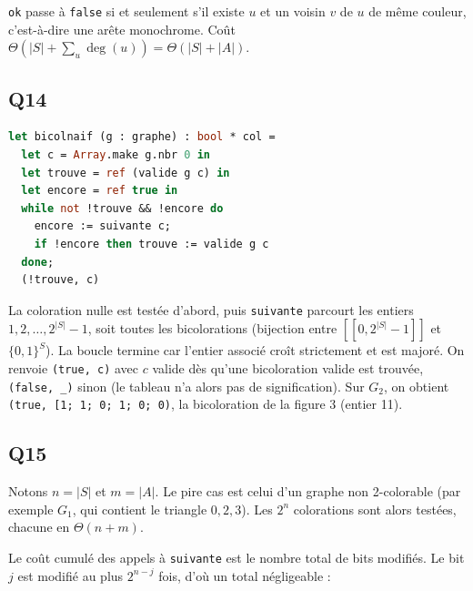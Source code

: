 \documentclass[11pt,a4paper]{article}
\newcommand{\equationajustee}[1]{%
  \sbox{\boiteequation}{$\displaystyle #1$}%
  \ifdim\wd\boiteequation>\linewidth
    \[\resizebox{\linewidth}{!}{\usebox{\boiteequation}}\]%
  \else
    \[#1\]%
  \fi}
\begin{document}
\texttt{ok} passe à \texttt{false} si et seulement s'il existe \(u\) et un voisin \(v\) de \(u\) de même couleur, c'est-à-dire une arête monochrome. Coût \(\Theta(|S| + \sum_u \deg(u)) = \Theta(|S| + |A|)\).

\hypertarget{q14}{%
\subsection{Q14}\label{q14}}

\begin{lstlisting}[language=Caml]
let bicolnaif (g : graphe) : bool * col =
  let c = Array.make g.nbr 0 in
  let trouve = ref (valide g c) in
  let encore = ref true in
  while not !trouve && !encore do
    encore := suivante c;
    if !encore then trouve := valide g c
  done;
  (!trouve, c)
\end{lstlisting}

La coloration nulle est testée d'abord, puis \texttt{suivante} parcourt les entiers \(1, 2, \dots, 2^{|S|} - 1\), soit toutes les bicolorations (bijection entre \([\![0, 2^{|S|} - 1]\!]\) et \(\{0,1\}^S\)). La boucle termine car l'entier associé croît strictement et est majoré. On renvoie \texttt{(true,\ c)} avec \(c\) valide dès qu'une bicoloration valide est trouvée, \texttt{(false,\ \_)} sinon (le tableau n'a alors pas de signification). Sur \(G_2\), on obtient \texttt{(\allowbreak{}true,\allowbreak{}\ {[}\textbar{}1;\allowbreak{}\ 1;\allowbreak{}\ 0;\allowbreak{}\ 1;\allowbreak{}\ 0;\allowbreak{}\ 0\textbar{}{]}\allowbreak{})\allowbreak{}}, la bicoloration de la figure 3 (entier 11).

\hypertarget{q15}{%
\subsection{Q15}\label{q15}}

Notons \(n = |S|\) et \(m = |A|\). Le pire cas est celui d'un graphe non 2-colorable (par exemple \(G_1\), qui contient le triangle \(0, 2, 3\)). Les \(2^n\) colorations sont alors testées, chacune en \(\Theta(n + m)\).

Le coût cumulé des appels à \texttt{suivante} est le nombre total de bits modifiés. Le bit \(j\) est modifié au plus \(2^{n-j}\) fois, d'où un total négligeable :

\equationajustee{\sum_j 2^{n-j} \le 2^{n+1}.}

\equationajustee{\boxed{\,C_{\text{pire}} = \Theta\big(2^{|S|}(|S| + |A|)\big) = O\big(2^{|S|}\,|S|^2\big)\,}}
\end{document}
